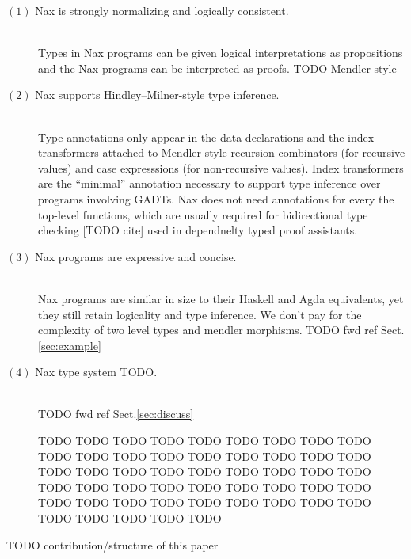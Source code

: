 \begin{description}
\item[$(1)$ Nax is strongly normalizing and logically consistent.]~\\
Types in Nax programs can be given logical interpretations as propositions
and the Nax programs can be interpreted as proofs. TODO Mendler-style

\item[$(2)$ Nax supports Hindley--Milner-style type inference.]~\\
Type annotations only appear in the data declarations and
the index transformers attached to Mendler-style recursion combinators
(for recursive values) and case expresssions (for non-recursive values).
Index transformers are the ``minimal''  annotation necessary to support
type inference over programs involving GADTs. Nax does not need annotations
for every the top-level functions, which are usually required for
bidirectional type checking [TODO cite] used in dependnelty typed
proof assistants.

\item[$(3)$ Nax programs are expressive and concise.]~\\
Nax programs are similar in size to their Haskell and Agda equivalents,
yet they still retain logicality and type inference. We don't pay for the
complexity of two level types and mendler morphisms.
TODO fwd ref Sect.\;\ref{sec:example}

\item[$(4)$ Nax type system TODO.]~\\
TODO fwd ref Sect.\;\ref{sec:discuss}

TODO TODO TODO TODO TODO TODO TODO TODO TODO TODO
TODO TODO TODO TODO TODO TODO TODO TODO TODO TODO
TODO TODO TODO TODO TODO TODO TODO TODO TODO TODO
TODO TODO TODO TODO TODO TODO TODO TODO TODO TODO
TODO TODO TODO TODO TODO TODO TODO TODO TODO TODO

\end{description}

TODO contribution/structure of this paper

